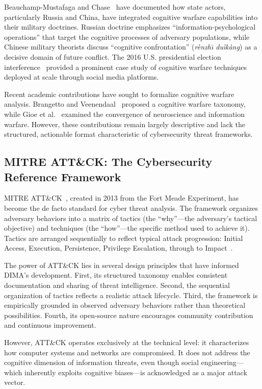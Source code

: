 \documentclass[11pt,a4paper]{article}
\begin{document}
Beauchamp-Mustafaga and Chase~\cite{beauchamp2020} have documented how state actors, particularly Russia and China, have integrated cognitive warfare capabilities into their military doctrines. Russian doctrine emphasizes ``information-psychological operations'' that target the cognitive processes of adversary populations, while Chinese military theorists discuss ``cognitive confrontation'' (\textit{r\`enzh\={\i} du\`ik\`ang}) as a decisive domain of future conflict. The 2016 U.S. presidential election interference~\cite{mueller2019} provided a prominent case study of cognitive warfare techniques deployed at scale through social media platforms.

Recent academic contributions have sought to formalize cognitive warfare analysis. Brangetto and Veenendaal~\cite{brangetto2016} proposed a cognitive warfare taxonomy, while Gioe et al.~\cite{gioe2020} examined the convergence of neuroscience and information warfare. However, these contributions remain largely descriptive and lack the structured, actionable format characteristic of cybersecurity threat frameworks.

\subsection{MITRE ATT\&CK: The Cybersecurity Reference Framework}

MITRE ATT\&CK~\cite{strom2020}, created in 2013 from the Fort Meade Experiment, has become the de facto standard for cyber threat analysis. The framework organizes adversary behaviors into a matrix of tactics (the ``why''---the adversary's tactical objective) and techniques (the ``how''---the specific method used to achieve it). Tactics are arranged sequentially to reflect typical attack progression: Initial Access, Execution, Persistence, Privilege Escalation, through to Impact~\cite{mitre2024}.

The power of ATT\&CK lies in several design principles that have informed DIMA's development. First, its structured taxonomy enables consistent documentation and sharing of threat intelligence. Second, the sequential organization of tactics reflects a realistic attack lifecycle. Third, the framework is empirically grounded in observed adversary behaviors rather than theoretical possibilities. Fourth, its open-source nature encourages community contribution and continuous improvement.

However, ATT\&CK operates exclusively at the technical level: it characterizes how computer systems and networks are compromised. It does not address the cognitive dimension of information threats, even though social engineering---which inherently exploits cognitive biases---is acknowledged as a major attack vector.
\end{document}
